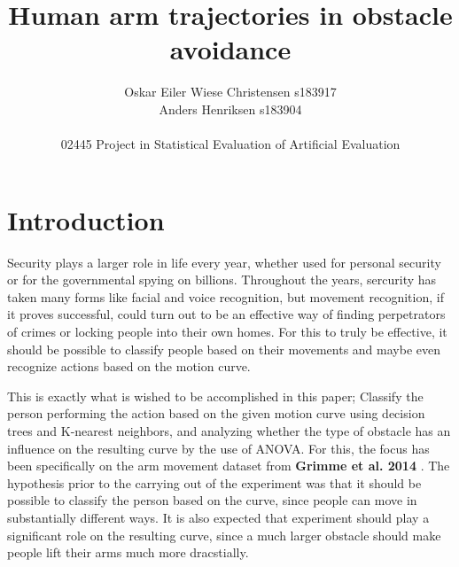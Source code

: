 \documentclass[11pt, fleqn, titlepage]{article}
\title{Human arm trajectories in obstacle avoidance}
\author{Oskar Eiler Wiese Christensen s183917 \\ Anders Henriksen s183904 \\ \\ 02445 Project in Statistical Evaluation of Artificial Evaluation}
\date{\today \vspace{2.5cm} \section*{\small Summary} 
\justify{\footnotesize  Security and access authorization plays a big role in modern society. Improvement of these systems could be accomplished by using movement curves to identify the person and give access only to those with authority. The purpose of this paper is to investigate if it is possible to identify people based on movement curves by using two machine learning models, K-nearest neighbors and a binary decision tree, as well as to test if experiment has a significant effect on curve by using a bunch of ANOVAs. The results show that it is to some extent possible to predict person from curve and that KNN is most effective at this task. Meanwhile, experiment has a significant effect on curve. This implies that movement curves might be useful for classifying people if using more complicated machine learning models. Meanwhile, performing different actions lead to different curves, which has positive implications for the possibility of movement-based surveillance.}}
\begin{document}
\maketitle
\tableofcontents \newpage

\section{Introduction}
Security plays a larger role in life every year, whether used for personal security or for the governmental spying on billions. Throughout the years, sercurity has taken many forms like facial and voice recognition, but movement recognition, if it proves successful, could turn out to be an effective way of finding perpetrators of crimes or locking people into their own homes. For this to truly be effective, it should be possible to classify people based on their movements and maybe even recognize actions based on the motion curve.

This is exactly what is wished to be accomplished in this paper; Classify the person performing the action based on the given motion curve using decision trees and K-nearest neighbors, and analyzing whether the type of obstacle has an influence on the resulting curve by the use of ANOVA. For this, the focus has been specifically on the arm movement dataset from \textbf{Grimme et al. 2014} \cite{armdata}. The hypothesis prior to the carrying out of the experiment was that it should be possible to classify the person based on the curve, since people can move in substantially different ways. It is also expected that experiment should play a significant role on the resulting curve, since a much larger obstacle should make people lift their arms much more dracstially.
\end{document}
